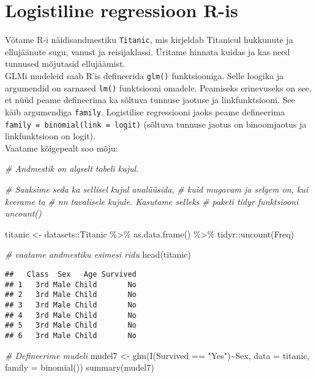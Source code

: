 \documentclass[
]{book}
\newenvironment{Shaded}{\begin{snugshade}}{\end{snugshade}}
\newcommand{\AttributeTok}[1]{\textcolor[rgb]{0.77,0.63,0.00}{#1}}
\newcommand{\CommentTok}[1]{\textcolor[rgb]{0.56,0.35,0.01}{\textit{#1}}}
\newcommand{\FunctionTok}[1]{\textcolor[rgb]{0.00,0.00,0.00}{#1}}
\newcommand{\NormalTok}[1]{#1}
\newcommand{\OtherTok}[1]{\textcolor[rgb]{0.56,0.35,0.01}{#1}}
\newcommand{\SpecialCharTok}[1]{\textcolor[rgb]{0.00,0.00,0.00}{#1}}
\newcommand{\StringTok}[1]{\textcolor[rgb]{0.31,0.60,0.02}{#1}}
\begin{document}
\hypertarget{logistiline-regressioon-r-is}{%
\section{Logistiline regressioon R-is}\label{logistiline-regressioon-r-is}}

Võtame R-i näidisandmestiku \texttt{Titanic}, mis kirjeldab Titanicul hukkunute ja ellujäänute sugu, vanust ja reisijaklassi. Üritame hinnata kuidas ja kas need tunnused mõjutasid ellujäämist.\\
GLMi mudeleid saab R'is defineerida \texttt{glm()} funktsiooniga. Selle loogika ja argumendid on sarnased \texttt{lm()} funktsiooni omadele. Peamiseks erinevuseks on see, et nüüd peame defineerima ka sõltuva tunnuse jaotuse ja linkfunktsiooni. See käib argumendiga \texttt{family}. Logistilise regressiooni jaoks peame defineerima \texttt{family\ =\ binomial(link\ =\ \textquotesingle{}logit\textquotesingle{})} (sõltuva tunnuse jaotus on binoomjaotus ja linkfunktsioon on logit).\\
Vaatame kõigepealt soo mõju:

\begin{Shaded}
\begin{Highlighting}[]
\CommentTok{\# Andmestik on algselt tabeli kujul.}

\CommentTok{\# Saaksime seda ka sellisel kujul analüüsida,}
\CommentTok{\# kuid mugavam ja selgem on, kui keerame ta}
\CommentTok{\# nn tavalisele kujule. Kasutame selleks }
\CommentTok{\# paketi tidyr funktsiooni uncount()}

\NormalTok{titanic }\OtherTok{\textless{}{-}}\NormalTok{ datasets}\SpecialCharTok{::}\NormalTok{Titanic }\SpecialCharTok{\%\textgreater{}\%} 
  \FunctionTok{as.data.frame}\NormalTok{() }\SpecialCharTok{\%\textgreater{}\%} 
\NormalTok{  tidyr}\SpecialCharTok{::}\FunctionTok{uncount}\NormalTok{(Freq)}

\CommentTok{\# vaatame andmestiku esimesi ridu}
\FunctionTok{head}\NormalTok{(titanic)}
\end{Highlighting}
\end{Shaded}

\begin{verbatim}
##   Class  Sex   Age Survived
## 1   3rd Male Child       No
## 2   3rd Male Child       No
## 3   3rd Male Child       No
## 4   3rd Male Child       No
## 5   3rd Male Child       No
## 6   3rd Male Child       No
\end{verbatim}

\begin{Shaded}
\begin{Highlighting}[]
\CommentTok{\# Defineerime mudeli}
\NormalTok{mudel7 }\OtherTok{\textless{}{-}} \FunctionTok{glm}\NormalTok{(}\FunctionTok{I}\NormalTok{(Survived }\SpecialCharTok{==} \StringTok{"Yes"}\NormalTok{)}\SpecialCharTok{\textasciitilde{}}\NormalTok{Sex, }\AttributeTok{data =}\NormalTok{ titanic, }\AttributeTok{family =} \FunctionTok{binomial}\NormalTok{())}
\FunctionTok{summary}\NormalTok{(mudel7)}
\end{Highlighting}
\end{Shaded}
\end{document}

